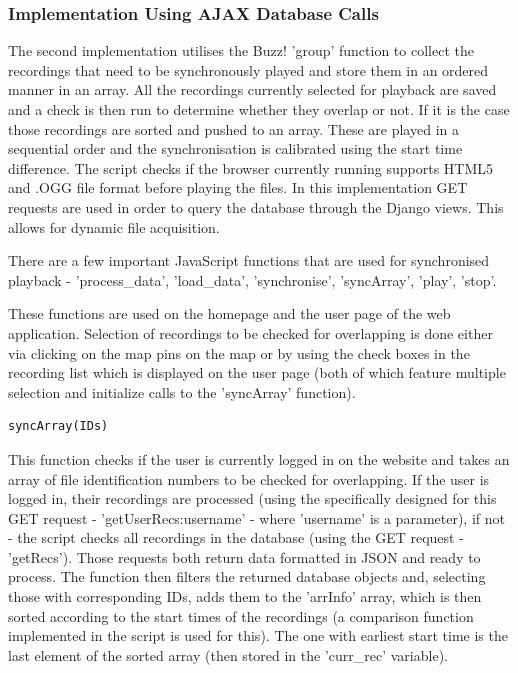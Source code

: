 \documentclass{l3proj}
\begin{document}
\subsubsection{Implementation Using \gls{AJAX} Database Calls}
The second implementation utilises the Buzz! 'group' function to collect the recordings that need to be synchronously played and store them in an ordered manner in an array. All the recordings currently selected for playback are saved and a check is then run to determine whether they overlap or not. If it is the case those recordings are sorted and pushed to an array. These are played in a sequential order and the synchronisation is calibrated using the start time difference. The script checks if the browser currently running supports HTML5  and .OGG file format before playing the files. In this implementation GET requests are used in order to query the database through the \gls{Django} views. This allows for dynamic file acquisition.

There are a few important \gls{JavaScript} functions that are used for synchronised playback - 'process\_data', 'load\_data', 'synchronise', 'syncArray', 'play', 'stop'.

These functions are used on the homepage and the user page of the web application. Selection of recordings to be checked for overlapping is done either via clicking on the map pins on the map or by using the check boxes in the recording list which is displayed on the user page (both of which feature multiple selection and initialize calls to the 'syncArray' function).

\begin{verbatim}
syncArray(IDs)
\end{verbatim}

This function checks if the user is currently logged in on the website and takes an array of file identification numbers to be checked for overlapping. If the user is logged in, their recordings are processed (using the specifically designed for this GET request - 'getUserRecs:username' - where 'username' is a parameter), if not - the script checks all recordings in the database (using the GET request - 'getRecs'). Those requests both return data formatted in JSON and ready to process. The function then filters the returned database objects and, selecting those with corresponding IDs, adds them to the 'arrInfo' array, which is then sorted according to the start times of the recordings (a comparison function implemented in the script is used for this). The one with earliest start time is the last element of the sorted array (then stored in the 'curr\_rec' variable).
\end{document}
